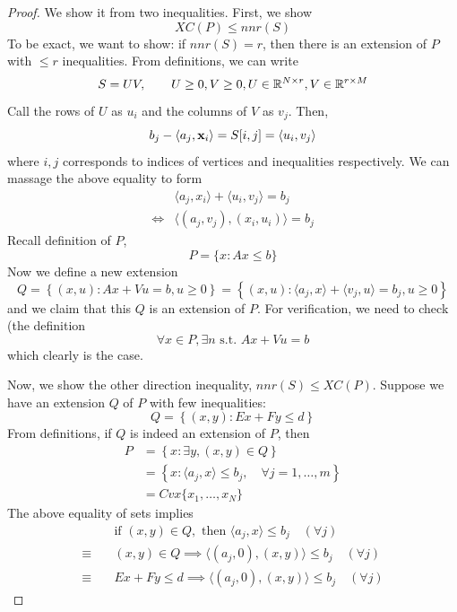 \begin{proof}
	We show it from two inequalities. First, we show 
	\begin{equation}
		XC(P) \leq nnr(S)
	\end{equation}
	To be exact, we want to show: if $nnr(S) = r$, then there is an extension of $P$ with $\leq r$ inequalities. From definitions, we can write
	\begin{equation}
		S = UV, \quad \quad U\geq0, V \geq 0, U \in \mathbb{R}^{N \times r}, V \in \mathbb{R}^{r \times M}
	\end{equation}
	Call the rows of $U$ as $u_i$ and the columns of $V$ as $v_j$. Then, 
	\begin{equation}
		b_j - \langle a_j, \mathbf{x}_i \rangle = S[i, j] = \langle u_i, v_j \rangle
	\end{equation}
	where $i, j$ corresponds to indices of vertices and inequalities respectively. We can massage the above equality to form
	\begin{align}
		&\langle a_j, x_i \rangle + \langle u_i, v_j \rangle = b_j \\
		\iff &\langle (a_j, v_j), (x_i, u_i) \rangle = b_j 
	\end{align}
	Recall definition of $P$,
	\begin{equation}
		P = \{x: Ax \leq b \}
	\end{equation}	
	Now we define a new extension
	\begin{equation}
		Q = \left\{ (x, u) : Ax + Vu = b , u \geq 0 \right\} = \left\{ (x, u) : \langle a_j, x \rangle + \langle v_j , u \rangle = b_j , u \geq 0 \right\}
	\end{equation}
	and we claim that this $Q$ is an extension of $P$. For verification, we need to check (the definition
	\begin{equation}
		\forall x \in P, \exists n \text{ s.t. } Ax + Vu = b
	\end{equation}
	which clearly is the case. 
	
	Now, we show the other direction inequality, $nnr(S) \leq XC(P)$. Suppose we have an extension $Q$ of $P$ with few inequalities: 
	\begin{equation}
		Q = \left\{ 
			(x, y) : Ex + Fy \leq d
		\right\} 
	\end{equation}
	From definitions, if $Q$ is indeed an extension of $P$, then 
	\begin{align}
		P 
		&= \left\{
			x : \exists y, (x, y) \in Q
		\right\} \\
		&= \left\{ 
			x : \langle a_j, x \rangle \leq b_j, \quad \forall j = 1, \dots, m
		\right\} \\
		&= Cvx \{x_1, \dots, x_N \}
	\end{align}	
	The above equality of sets implies 
	\begin{align}
		&\text{if } (x, y) \in Q, \text{ then } \langle a_j, x \rangle \leq b_j \quad (\forall j) \\
		\equiv\quad &(x, y) \in Q \implies \langle (a_j, 0), (x, y) \rangle \leq b_j \quad (\forall j) \\
		\equiv\quad & Ex + Fy \leq d \implies \langle (a_j, 0), (x, y) \rangle \leq b_j \quad (\forall j)
	\end{align}
	

\end{proof}

